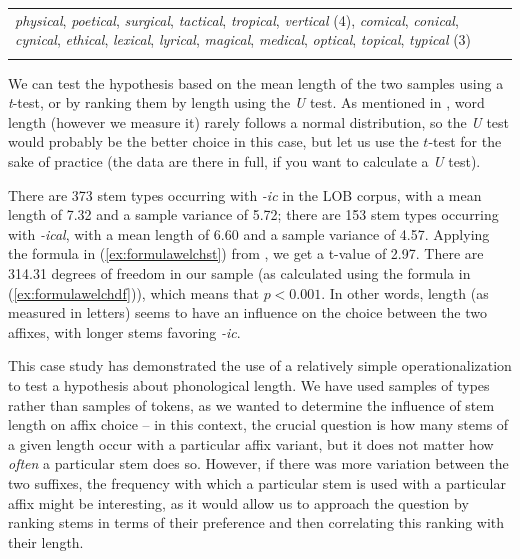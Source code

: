 \begin{table}
\begin{tabularx}{\textwidth}{Q}
\textit{physical}, \textit{poetical}, \textit{surgical}, \textit{tactical}, \textit{tropical}, \textit{vertical} (4), \textit{comical}, \textit{conical}, \textit{cynical}, \textit{ethical}, \textit{lexical}, \textit{lyrical}, \textit{magical}, \textit{medical}, \textit{optical}, \textit{topical}, \textit{typical} (3)\\
\lspbottomrule
\end{tabularx}
\end{table}

We can test the hypothesis based on the mean  length  of the two samples using a \textit{t}-test,  or by ranking them by length using the \textit{U} test. As mentioned in , word length (however we measure  it) rarely follows a normal distribution,  so the \textit{U} test would probably be the better choice in this case, but let us use the $t$\hyp{}test for the sake of practice (the data are there in full, if you want to calculate a \textit{U} test).

There are 373 stem types  occurring with \textit{-ic} in the LOB  corpus, with a mean  length  of 7.32 and a sample variance  of 5.72; there are 153 stem types occurring with \textit{-ical}, with a mean length of 6.60 and a sample variance of 4.57. Applying the formula in (\ref{ex:formulawelchst}) from , we get a t\hyp{}value of 2.97. There are 314.31 degrees of freedom in our sample (as calculated using the formula in (\ref{ex:formulawelchdf})), which means that $p < 0.001$. In other words, length  (as measured  in letters) seems to have an influence on the choice between the two affixes,  with longer stems  favoring \textit{-ic}.

This case study has demonstrated the use of a relatively simple operationalization  to test a hypothesis about phonological length.  We have used samples of types  rather than samples of tokens,  as we wanted to determine the influence of stem  length on affix  choice -- in this context, the crucial question is how many stems of a given length  occur with a particular affix  variant, but it does not matter how \textit{often} a particular stem  does so. However, if there was more variation  between the two suffixes,  the frequency with which a particular stem is used with a particular affix might be interesting, as it would allow us to approach the question by ranking stems  in terms of their preference and then correlating  this ranking with their  length.

